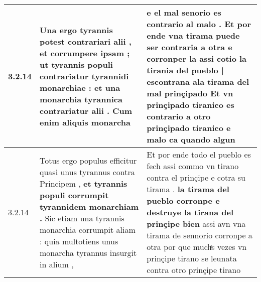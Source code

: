 \begin{tabular}{|p{1cm}|p{6.5cm}|p{6.5cm}|}
3.2.14 & Una ergo tyrannis potest contrariari alii , et corrumpere ipsam ; \textbf{ ut tyrannis populi contrariatur tyrannidi monarchiae : } et una monarchia tyrannica contrariatur alii . Cum enim aliquis monarcha & e el mal senorio es contrario al malo . Et por ende vna tirama puede ser contraria a otra \textbf{ e corronper la assi cotio la tirania del pueblo | escontrana ala tirama del mal prinçipado } Et vn prinçipado tiranico es contrario a otro prinçipado tiranico e malo ca quando algun \\\hline
3.2.14 & Totus ergo populus efficitur quasi unus tyrannus contra Principem , \textbf{ et tyrannis populi corrumpit tyrannidem monarchiam . } Sic etiam una tyrannis monarchia corrumpit aliam : quia multotiens unus monarcha tyrannus insurgit in alium , & Et por ende todo el pueblo es fech assi commo vn tirano contra el prinçipe e cotra su tirama . \textbf{ la tirama del pueblo corronpe e destruye la tirana del prinçipe bien } assi avn vna tirama de sennorio corronpe a otra por que muchͣs vezes vn prinçipe tirano se leunata contra otro prinçipe tirano \\\hline

\end{tabular}
